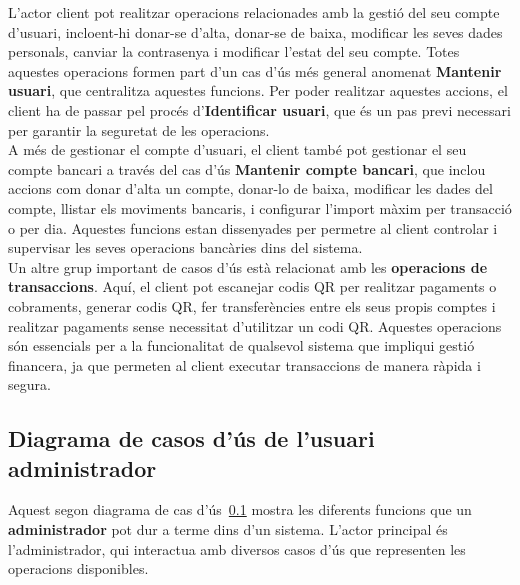 \documentclass[a4paper,12pt,twoside]{ThesisStyle}
\begin{document}
L'actor client pot realitzar operacions relacionades amb la gestió del seu compte d'usuari, incloent-hi donar-se d'alta, donar-se de baixa, modificar les seves dades personals, canviar la contrasenya i modificar l'estat del seu compte. Totes aquestes operacions formen part d'un cas d'ús més general anomenat \textbf{Mantenir usuari}, que centralitza aquestes funcions. Per poder realitzar aquestes accions, el client ha de passar pel procés d'\textbf{Identificar usuari}, que és un pas previ necessari per garantir la seguretat de les operacions.\\

A més de gestionar el compte d'usuari, el client també pot gestionar el seu compte bancari a través del cas d'ús \textbf{Mantenir compte bancari}, que inclou accions com donar d'alta un compte, donar-lo de baixa, modificar les dades del compte, llistar els moviments bancaris, i configurar l'import màxim per transacció o per dia. Aquestes funcions estan dissenyades per permetre al client controlar i supervisar les seves operacions bancàries dins del sistema.\\

Un altre grup important de casos d'ús està relacionat amb les \textbf{operacions de transaccions}. Aquí, el client pot escanejar codis QR per realitzar pagaments o cobraments, generar codis QR, fer transferències entre els seus propis comptes i realitzar pagaments sense necessitat d'utilitzar un codi QR. Aquestes operacions són essencials per a la funcionalitat de qualsevol sistema que impliqui gestió financera, ja que permeten al client executar transaccions de manera ràpida i segura.\\



\subsection{Diagrama de casos d'ús de l'usuari administrador}
\label{subsec: Diagrama de casos d'ús de l'usuari administrador}

Aquest segon diagrama de cas d'ús~\ref{subsec: Diagrama de casos d'ús de l'usuari administrador} mostra les diferents funcions que un \textbf{administrador} pot dur a terme dins d'un sistema. L'actor principal és l'administrador, qui interactua amb diversos casos d'ús que representen les operacions disponibles.
\end{document}
